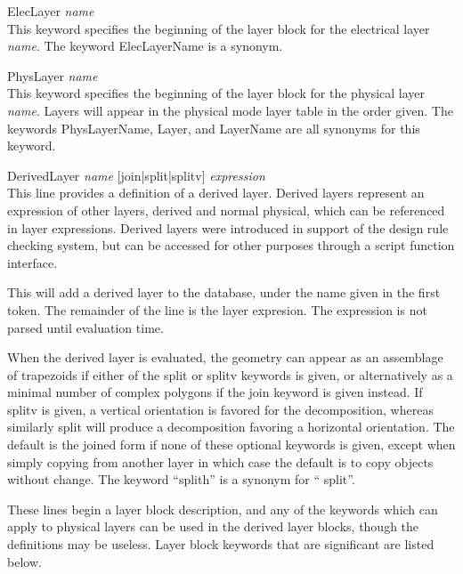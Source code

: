 \begin{description}
\item{\vt ElecLayer} {\it name}\\
This keyword specifies the beginning of the layer block for the
electrical layer {\it name\/}.  The keyword {\vt ElecLayerName} is a
synonym.

\item{\vt PhysLayer} {\it name}\\
This keyword specifies the beginning of the layer block for the
physical layer {\it name\/}.  Layers will appear in the physical mode
layer table in the order given.  The keywords {\vt PhysLayerName},
{\vt Layer}, and {\vt LayerName} are all synonyms for this keyword.

\item{\vt DerivedLayer} {\it name} [{\vt join|split|splitv}]
 {\it expression}\\
This line provides a definition of a derived layer.  Derived layers
represent an expression of other layers, derived and normal physical,
which can be referenced in layer expressions.  Derived layers were
introduced in support of the design rule checking system, but can be
accessed for other purposes through a script function interface.

This will add a derived layer to the database, under the name given in
the first token.  The remainder of the line is the layer expresion. 
The expression is not parsed until evaluation time.

When the derived layer is evaluated, the geometry can appear as an
assemblage of trapezoids if either of the {\vt split} or {\vt splitv}
keywords is given, or alternatively as a minimal number of complex
polygons if the {\vt join} keyword is given instead.  If {\vt splitv}
is given, a vertical orientation is favored for the decomposition,
whereas similarly {\vt split} will produce a decomposition favoring a
horizontal orientation.  The default is the joined form if none of
these optional keywords is given, except when simply copying from
another layer in which case the default is to copy objects without
change.  The keyword ``{\vt splith}'' is a synonym for ``{\vt
split}''.

These lines begin a layer block description, and any of the keywords
which can apply to physical layers can be used in the derived layer
blocks, though the definitions may be useless.  Layer block keywords
that are significant are listed below.


\end{description}
